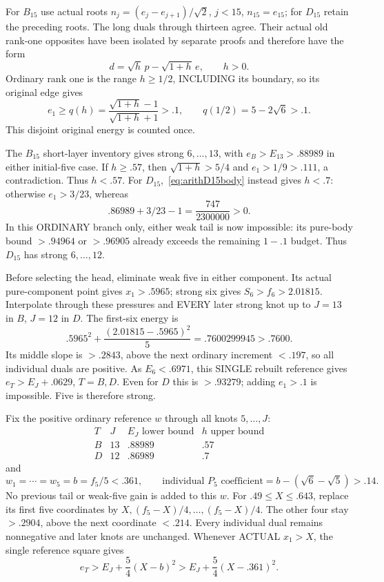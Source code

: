 \documentclass[11pt]{article}
\begin{document}
For \(B_{15}\) use actual roots
\(n_j=(e_j-e_{j+1})/\sqrt2\), \(j<15\), \(n_{15}=e_{15}\);
for \(D_{15}\) retain the preceding roots.
The long duals through thirteen agree.
Their actual old rank-one opposites have been isolated
by separate proofs and therefore have the form
\[
                d=\sqrt h\,p-\sqrt{1+h}\,e,\qquad h>0.
\]
Ordinary rank one is the range \(h\ge1/2\), INCLUDING
its boundary, so its original edge gives
\[
 e_1\ge q(h)={\frac{\sqrt{1+h}-1}{\sqrt{1+h}+1}}>.1,
 \qquad q(1/2)=5-2\sqrt6>.1 .
\]
This disjoint original energy is counted once.

The \(B_{15}\) short-layer inventory gives strong
\(6,\ldots,13\), with \(e_B>E_{13}>.88989\)
in either initial-five case.
If \(h\ge.57\), then \(\sqrt{1+h}>5/4\)
and \(e_1>1/9>.111\), a contradiction.
Thus \(h<.57\).
For \(D_{15}\),~\eqref{eq:arithD15body} instead gives
\(h<.7\): otherwise \(e_1>3/23\), whereas
\[
                         .86989+3/23-1={\frac{747}{2300000}}>0 .
\]
In this ORDINARY branch only, either weak tail is now
impossible: its pure-body bound \(>.94964\) or \(>.96905\)
already exceeds the remaining \(1-.1\) budget.
Thus \(D_{15}\) has strong \(6,\ldots,12\).

Before selecting the head, eliminate weak five in either
component.
Its actual pure-component point gives \(x_1>.5965\);
strong six gives \(S_6>f_6>2.01815\).
Interpolate through these pressures and EVERY later
strong knot up to \(J=13\) in \(B\), \(J=12\) in \(D\).
The first-six energy is
\[
 .5965^2+{\frac{(2.01815-.5965)^2}{5}}
        =.7600299945>.7600 .
\]
Its middle slope is \(>.2843\), above the next ordinary
increment \(<.197\), so all individual duals are positive.
As \(E_6<.6971\), this SINGLE rebuilt reference gives
\(e_T>E_J+.0629\), \(T=B,D\).
Even for \(D\) this is \(>.93279\); adding \(e_1>.1\)
is impossible.
Five is therefore strong.

Fix the positive ordinary reference \(w\) through all
knots \(5,\ldots,J\):
\[
 \begin{array}{c|c|c|c}
 T&J&E_J\text{ lower bound}&h\text{ upper bound}\\ \hline
 B&13&.88989&.57\\
 D&12&.86989&.7
 \end{array}
\]
and
\[
 w_1=\cdots=w_5=b=f_5/5<.361,\qquad
 \text{individual }P_5\text{ coefficient}=
 b-(\sqrt6-\sqrt5)>.14 .
\]
No previous tail or weak-five gain is added to this \(w\).
For \(.49\le X\le.643\), replace its first five
coordinates by \(X,(f_5-X)/4,\ldots,(f_5-X)/4\).
The other four stay \(>.2904\), above the next
coordinate \(<.214\).
Every individual dual remains nonnegative and later
knots are unchanged.
Whenever ACTUAL \(x_1>X\), the single reference square gives
\[
                   e_T>E_J+{\frac{5}{4}}(X-b)^2
                       >E_J+{\frac{5}{4}}(X-.361)^2 .
\tag{R1G}\label{eq:arithBD15graft}
\]
\end{document}
